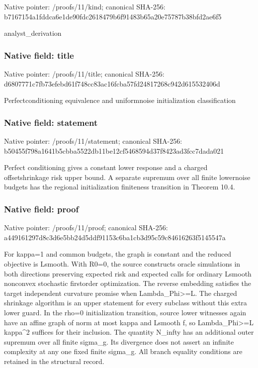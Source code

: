 \documentclass[10pt,a4paper]{article}
\begin{document}
Native pointer: /proofs/11/kind; canonical SHA-256: b7167154a1fddca6e1de90fd\allowbreak{}c2618479b6f91483b65a20e7\allowbreak{}5787b38bfd2ae6f5


analyst\_derivation


\subsubsection{Native field: title}


Native pointer: /proofs/11/title; canonical SHA-256: d6807771c7fb73efebd61f74\allowbreak{}8cc83ac16fcba57fd2481726\allowbreak{}8c942d615532406d


Perfectconditioning equivalence and uniformnoise initialization classification


\subsubsection{Native field: statement}


Native pointer: /proofs/11/statement; canonical SHA-256: b50455f798a1641b5cbba552\allowbreak{}2db11be12cf5468594d37f84\allowbreak{}23ad3fcc7dada021


Perfect conditioning gives a constant lower response and a charged offsetshrinkage risk upper bound. A separate supremum over all finite lowernoise budgets has the regional initialization finiteness transition in Theorem 10.4.


\subsubsection{Native field: proof}


Native pointer: /proofs/11/proof; canonical SHA-256: a449161297d8c3d6e5bb24d5\allowbreak{}ddf91153c6ba1cb3d95c59c8\allowbreak{}4616263f5145547a


For kappa=1 and common budgets, the graph is constant and the reduced objective is Lsmooth. With R0=0, the source constructs oracle simulations in both directions preserving expected risk and expected calls for ordinary Lsmooth nonconvex stochastic firstorder optimization. The reverse embedding satisfies the target independent curvature promise when Lambda\_Phi>=L. The charged shrinkage algorithm is an upper statement for every subclass without this extra lower guard. In the rho=0 initialization transition, source lower witnesses again have an affine graph of norm at most kappa and Lsmooth f, so Lambda\_Phi>=L kappa\textasciicircum{}2 suffices for their inclusion. The quantity N\_infty has an additional outer supremum over all finite sigma\_g. Its divergence does not assert an infinite complexity at any one fixed finite sigma\_g. All branch equality conditions are retained in the structural record.
\end{document}
